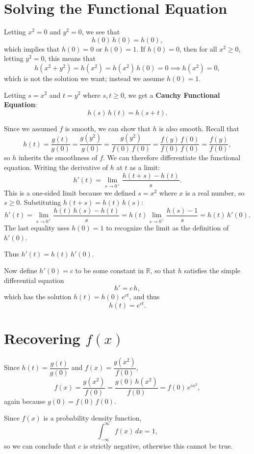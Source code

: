 \documentclass[12pt]{article}
\begin{document}
\section*{Solving the Functional Equation}
 
Letting $x^2 = 0$ and $y^2 = 0$, we see that
\[
    h(0)\,h(0) = h(0),
\]
which implies that $h(0) = 0$ or $h(0) = 1$. If $h(0) = 0$, then for all $x^2 \geq 0$, letting $y^2 = 0$, this means that
\[
    h(x^2 + y^2) = h(x^2) = h(x^2)\,h(0) = 0 \implies h(x^2) = 0,
\]
which is not the solution we want; instead we assume $h(0) = 1$.
 
Letting $s = x^2$ and $t = y^2$ where $s, t \geq 0$, we get a \textbf{Cauchy Functional Equation}:
\[
    h(s)\,h(t) = h(s + t).
\]
 
Since we assumed $f$ is smooth, we can show that $h$ is also smooth. Recall that
\[
    h(t) = \frac{g(t)}{g(0)} = \frac{g(y^2)}{g(0)} = \frac{g(y^2)}{f(0)\,f(0)} = \frac{f(y)\,f(0)}{f(0)\,f(0)} = \frac{f(y)}{f(0)},
\]
so $h$ inherits the smoothness of $f$. We can therefore differentiate the functional equation. Writing the derivative of $h$ at $t$ as a limit:
\[
    h'(t) = \lim_{s \to 0^+} \frac{h(t + s) - h(t)}{s}.
\]
This is a one-sided limit because we defined $s = x^2$ where $x$ is a real number, so $s \geq 0$. Substituting $h(t + s) = h(t)\,h(s)$:
\[
    h'(t) = \lim_{s \to 0^+} \frac{h(t)\,h(s) - h(t)}{s} = h(t) \lim_{s \to 0^+} \frac{h(s) - 1}{s} = h(t)\,h'(0).
\]
The last equality uses $h(0) = 1$ to recognize the limit as the definition of $h'(0)$.
 
Thus $h'(t) = h(t)\,h'(0)$.
 
Now define $h'(0) = c$ to be some constant in $\mathbb{R}$, so that $h$ satisfies the simple differential equation
\[
    h' = c\,h,
\]
which has the solution $h(t) = h(0)\,e^{ct}$, and thus
\[
    h(t) = e^{ct}.
\]
 
\section*{Recovering $f(x)$}
 
Since $h(t) = \dfrac{g(t)}{g(0)}$ and $f(x) = \dfrac{g(x^2)}{f(0)}$,
\[
    f(x) = \frac{g(x^2)}{f(0)} = \frac{g(0)\,h(x^2)}{f(0)} = f(0)\,e^{cx^2},
\]
again because $g(0) = f(0)\,f(0)$.
 
Since $f(x)$ is a probability density function,
\[
    \int_{-\infty}^{\infty} f(x)\,dx = 1,
\]
so we can conclude that $c$ is strictly negative, otherwise this cannot be true.
 
\end{document}
